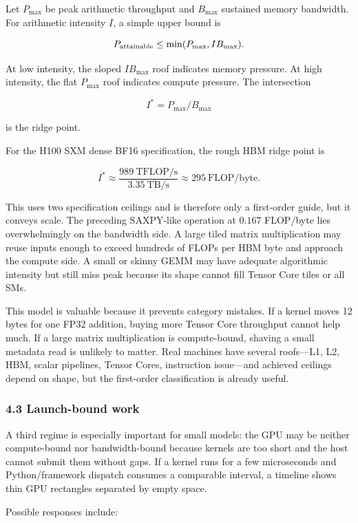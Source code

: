 \documentclass[
  10pt,
  letterpaper,
]{article}
\begin{document}
Let \(P_{\max}\) be peak arithmetic throughput and \(B_{\max}\)
sustained memory bandwidth. For arithmetic intensity \(I\), a simple
upper bound is

\[
P_{\rm attainable}\leq\min(P_{\max}, I B_{\max}).
\]

At low intensity, the sloped \(IB_{\max}\) roof indicates memory
pressure. At high intensity, the flat \(P_{\max}\) roof indicates
compute pressure. The intersection

\[
I^*=P_{\max}/B_{\max}
\]

is the ridge point.

For the H100 SXM dense BF16 specification, the rough HBM ridge point is

\[
I^*\approx\frac{989\ \text{TFLOP/s}}{3.35\ \text{TB/s}}
\approx295\ \text{FLOP/byte}.
\]

This uses two specification ceilings and is therefore only a first-order
guide, but it conveys scale. The preceding SAXPY-like operation at
\(0.167\) FLOP/byte lies overwhelmingly on the bandwidth side. A large
tiled matrix multiplication may reuse inputs enough to exceed hundreds
of FLOPs per HBM byte and approach the compute side. A small or skinny
GEMM may have adequate algorithmic intensity but still miss peak because
its shape cannot fill Tensor Core tiles or all SMs.

This model is valuable because it prevents category mistakes. If a
kernel moves 12 bytes for one FP32 addition, buying more Tensor Core
throughput cannot help much. If a large matrix multiplication is
compute-bound, shaving a small metadata read is unlikely to matter. Real
machines have several roofs---L1, L2, HBM, scalar pipelines, Tensor
Cores, instruction issue---and achieved ceilings depend on shape, but
the first-order classification is already useful.

\subsubsection{4.3 Launch-bound work}\label{43-launch-bound-work}

A third regime is especially important for small models: the GPU may be
neither compute-bound nor bandwidth-bound because kernels are too short
and the host cannot submit them without gaps. If a kernel runs for a few
microseconds and Python/framework dispatch consumes a comparable
interval, a timeline shows thin GPU rectangles separated by empty space.

Possible responses include:
\end{document}
